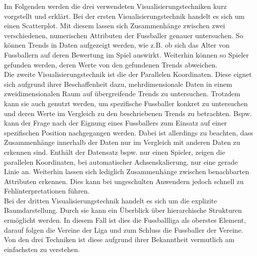 \documentclass[usegeometry=true]{scrartcl}
\begin{document}
Im Folgenden werden die drei verwendeten Visualisierungstechniken kurz vorgstellt und erklärt.
Bei der ersten Visualisierungstechnik handelt es sich um einen Scatterplot.\cite{noauthor_complete_nodate} Mit diesem lassen sich Zusammenhänge zwischen zwei verschiedenen, numerischen Attributen der Fussballer genauer untersuchen. So können Trends in Daten aufgezeigt werden, wie z.B. ob sich das Alter von Fussballern auf deren Bewertung im Spiel auswirkt.
Weiterhin können so Spieler gefunden werden, deren Werte von den gefundenen Trends abweichen.\\
Die zweite Visualisierungstechnik ist die der Parallelen Koordinaten.\cite{few_multivariate_2006} Diese eignet sich aufgrund ihrer Beschaffenheit dazu, mehrdimensionale Daten in einem zweidimensionalen Raum auf übergreifende Trends zu untersuchen. Trotzdem kann sie auch genutzt werden, um spezifische Fussballer konkret zu untersuchen und deren Werte im Vergleich zu den beschriebenen Trends zu betrachten. Bspw. kann der Frage nach der Eignung eines Fussballers zum Einsatz auf einer spezifischen Position nachgegangen werden. Dabei ist allerdings zu beachten, dass Zusammenhänge innerhalb der Daten nur im Vergleich mit anderen Daten zu erkennen sind. Enthält der Datensatz bspw. nur einen Spieler, zeigen die parallelen Koordinaten, bei automatischer Achsenskalierung, nur eine gerade Linie an. Weiterhin lassen sich lediglich Zusammenhänge zwischen benachbarten Attributen erkennen. Dies kann bei ungeschulten Anwendern jedoch schnell zu Fehlinterpretationen führen.\\
Bei der dritten Visualisierungstechnik handelt es sich um die explizite Baumdarstellung. Durch sie kann ein Überblick über hierarchische Strukturen ermöglicht werden. In diesem Fall ist dies die Fussballliga als oberstes Element, darauf folgen die Vereine der Liga und zum Schluss die Fussballer der Vereine. Von den drei Techniken ist diese aufgrund ihrer Bekanntheit vermutlich am einfachsten zu verstehen.



\end{document}
